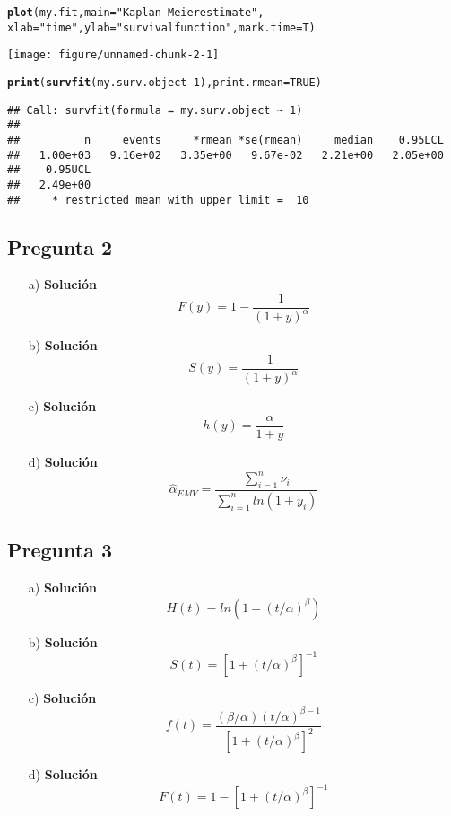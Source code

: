 \documentclass[10pt]{article}\usepackage[]{graphicx}\usepackage[]{color}
\makeatletter
\def\maxwidth{ %
  \ifdim\Gin@nat@width>\linewidth
    \linewidth
  \else
    \Gin@nat@width
  \fi
}
\newcommand{\hlnum}[1]{\textcolor[rgb]{0.686,0.059,0.569}{#1}}%
\newcommand{\hlstr}[1]{\textcolor[rgb]{0.192,0.494,0.8}{#1}}%
\newcommand{\hlopt}[1]{\textcolor[rgb]{0,0,0}{#1}}%
\newcommand{\hlstd}[1]{\textcolor[rgb]{0.345,0.345,0.345}{#1}}%
\newcommand{\hlkwc}[1]{\textcolor[rgb]{0.333,0.667,0.333}{#1}}%
\newcommand{\hlkwd}[1]{\textcolor[rgb]{0.737,0.353,0.396}{\textbf{#1}}}%
\newenvironment{kframe}{%
 \def\at@end@of@kframe{}%
 \ifinner\ifhmode%
  \def\at@end@of@kframe{\end{minipage}}%
  \begin{minipage}{\columnwidth}%
 \fi\fi%
 \def\FrameCommand##1{\hskip\@totalleftmargin \hskip-\fboxsep
 \colorbox{shadecolor}{##1}\hskip-\fboxsep
     \hskip-\linewidth \hskip-\@totalleftmargin \hskip\columnwidth}%
 \MakeFramed {\advance\hsize-\width
   \@totalleftmargin\z@ \linewidth\hsize
   \@setminipage}}%
 {\par\unskip\endMakeFramed%
 \at@end@of@kframe}
\newenvironment{knitrout}{}{} %
\makeatother
\begin{document}
{\begin{itemize}
\begin{knitrout}
\begin{kframe}
\begin{alltt}
\hlkwd{plot}\hlstd{(my.fit,} \hlkwc{main}\hlstd{=}\hlstr{"Kaplan-Meier estimate"}\hlstd{,}
     \hlkwc{xlab}\hlstd{=}\hlstr{"time"}\hlstd{,} \hlkwc{ylab}\hlstd{=}\hlstr{"survival function"}\hlstd{,}\hlkwc{mark.time}\hlstd{=T)}
\end{alltt}
\end{kframe}
\texttt{[image: figure/unnamed-chunk-2-1]} 
\begin{kframe}\begin{alltt}
\hlkwd{print}\hlstd{(}\hlkwd{survfit}\hlstd{(my.surv.object} \hlopt{~} \hlnum{1}\hlstd{),} \hlkwc{print.rmean}\hlstd{=}\hlnum{TRUE}\hlstd{)}
\end{alltt}
\begin{verbatim}
## Call: survfit(formula = my.surv.object ~ 1)
## 
##          n     events     *rmean *se(rmean)     median    0.95LCL 
##   1.00e+03   9.16e+02   3.35e+00   9.67e-02   2.21e+00   2.05e+00 
##    0.95UCL 
##   2.49e+00 
##     * restricted mean with upper limit =  10
\end{verbatim}
\end{kframe}
\end{knitrout}


\end{itemize}

\subsection*{Pregunta 2} 
\begin{itemize}
\item[a)] \textbf{Solución}\\
$$ F(y) = 1-\frac{1}{(1+y)^{\alpha}}$$
\item[b)] \textbf{Solución}\\
$$S(y)=\frac{1}{(1+y)^{\alpha}}$$
\item[c)] \textbf{Solución}\\
$$ h(y)=\frac{\alpha}{1+y}$$
\item[d)] \textbf{Solución}\\
$$\hat{\alpha}_{EMV}=\frac{\sum_{i=1}^{n}{\nu_{i}}}{\sum_{i=1}^{n}{ln(1+y_{i})}}$$
\end{itemize}

\subsection*{Pregunta 3} 
\begin{itemize} 
\item[a)] \textbf{Solución}\\
$$H(t)=ln(1+(t/\alpha)^{\beta})$$
\item[b)] \textbf{Solución}\\ 
$$S(t)=[1+(t/\alpha)^{\beta}]^{-1}$$
\item[c)] \textbf{Solución}\\ 
$$f(t)=\frac{(\beta/\alpha)(t/\alpha)^{\beta-1}}{[1+(t/\alpha)^{\beta}]^{2}}$$
\item[d)] \textbf{Solución}\\
$$F(t)=1-[1+(t/\alpha)^{\beta}]^{-1}$$
\end{itemize}

}
\end{document}
